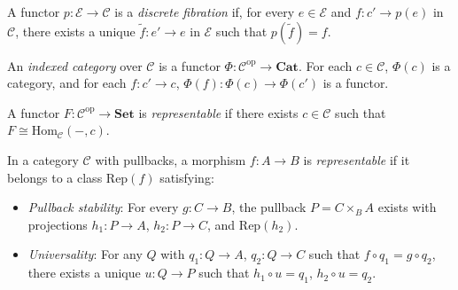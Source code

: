 \documentclass{article}
\begin{document}
\begin{definition}
A functor \(p : \mathcal{E} \to \mathcal{C}\) is a \emph{discrete fibration} if, for every \(e \in \mathcal{E}\) and \(f : c' \to p(e)\) in \(\mathcal{C}\), there exists a unique \(\tilde{f} : e' \to e\) in \(\mathcal{E}\) such that \(p(\tilde{f}) = f\).
\end{definition}

\begin{definition}
An \emph{indexed category} over \(\mathcal{C}\) is a functor \(\Phi : \mathcal{C}^{\mathrm{op}} \to \mathbf{Cat}\). For each \(c \in \mathcal{C}\), \(\Phi(c)\) is a category, and for each \(f : c' \to c\), \(\Phi(f) : \Phi(c) \to \Phi(c')\) is a functor.
\end{definition}

\begin{definition}
A functor \(F : \mathcal{C}^{\mathrm{op}} \to \mathbf{Set}\) is \emph{representable} if there exists \(c \in \mathcal{C}\) such that \(F \cong \mathrm{Hom}_{\mathcal{C}}(-, c)\).
\end{definition}

\begin{definition}
In a category \(\mathcal{C}\) with pullbacks, a morphism \(f : A \to B\) is \emph{representable} if it belongs to a class \(\mathrm{Rep}(f)\) satisfying:
\begin{itemize}
    \item \emph{Pullback stability}: For every \(g : C \to B\), the pullback \(P = C \times_B A\) exists with projections \(h_1 : P \to A\), \(h_2 : P \to C\), and \(\mathrm{Rep}(h_2)\).
    \item \emph{Universality}: For any \(Q\) with \(q_1 : Q \to A\), \(q_2 : Q \to C\) such that \(f \circ q_1 = g \circ q_2\), there exists a unique \(u : Q \to P\) such that \(h_1 \circ u = q_1\), \(h_2 \circ u = q_2\).
\end{itemize}
\end{definition}

\end{document}
